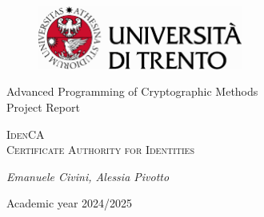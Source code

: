 \pagestyle{plain}
\thispagestyle{empty}

  \vspace*{\fill}

  \begin{center}
  \begin{figure}[h!]
    \centering
    \includegraphics[keepaspectratio, width=0.6\textwidth]{Pic/marchio_unitrento_colore_it_202002.eps}
  \end{figure}

  \vspace{2 cm} 

  \LARGE{Advanced Programming of Cryptographic Methods}\\

  \vspace{1 cm} 
  \Large{Project Report}

  \vspace{2 cm} 

  \Huge\textsc{IdenCA\\Certificate Authority for Identities}

    \vspace{2 cm} 

  \Large{\it{ Emanuele Civini, Alessia Pivotto }}

  \vspace{2 cm} 

  \Large{Academic year 2024/2025}
  \vspace*{\fill}
\end{center}
